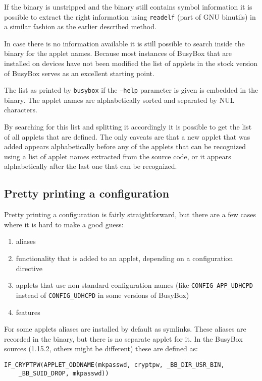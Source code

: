 \documentclass[10pt]{article}
\begin{document}
If the binary is unstripped and the binary still contains symbol information
it is possible to extract the right information using \texttt{readelf} (part
of GNU binutils) in a similar fashion as the earlier described method.

In case there is no information available it is still possible to search inside
the binary for the applet names. Because most instances of BusyBox that are
installed on devices have not been modified the list of applets in the stock
version of BusyBox serves as an excellent starting point.

The list as printed by \texttt{busybox} if the \texttt{--help} parameter is
given is embedded in the binary. The applet names are alphabetically sorted
and separated by NUL characters.

By searching for this list and splitting it accordingly it is possible to get
the list of all applets that are defined. The only caveats are that a new
applet that was added appears alphabetically before any of the applets that
can be recognized using a list of applet names extracted from the source code,
or it appears alphabetically after the last one that can be recognized.

\subsection{Pretty printing a configuration}

Pretty printing a configuration is fairly straightforward, but there are a few
cases where it is hard to make a good guess:

\begin{enumerate}
\item aliases
\item functionality that is added to an applet, depending on a configuration
directive
\item applets that use non-standard configuration names (like
\texttt{CONFIG\_APP\_UDHCPD} instead of \texttt{CONFIG\_UDHCPD} in some
versions of BusyBox)
\item features
\end{enumerate}

For some applets aliases are installed by default as symlinks. These aliases
are recorded in the binary, but there is no separate applet for it. In the
BusyBox sources (1.15.2, others might be different) these are defined as:

\begin{verbatim}
IF_CRYPTPW(APPLET_ODDNAME(mkpasswd, cryptpw, _BB_DIR_USR_BIN,
    _BB_SUID_DROP, mkpasswd))
\end{verbatim}
\end{document}
